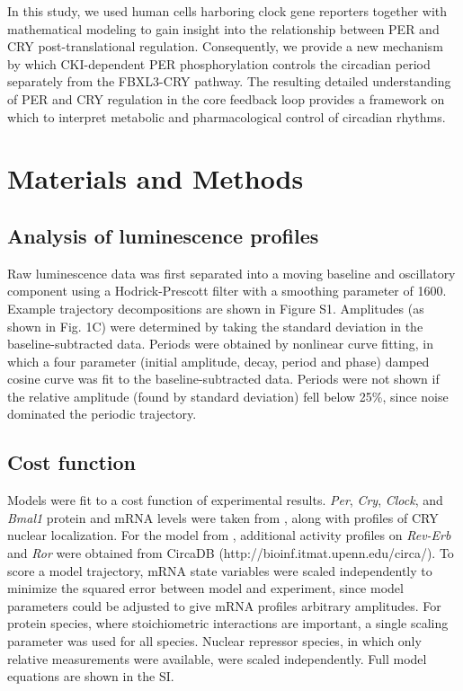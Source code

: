 In this study, we used human cells harboring clock gene reporters together with
mathematical modeling to gain insight into the relationship between PER and CRY
post-translational regulation. Consequently, we provide a new mechanism by
which CKI-dependent PER phosphorylation controls the circadian period
separately from the FBXL3-CRY pathway. The resulting detailed understanding of
PER and CRY regulation in the core feedback loop provides a framework on which
to interpret metabolic and pharmacological control of circadian rhythms.

\section{Materials and Methods}
\subsection{Analysis of luminescence profiles}
Raw luminescence data was first separated into a moving baseline and oscillatory
component using a Hodrick-Prescott filter with a smoothing parameter of 1600.
Example trajectory decompositions are shown in Figure S1. Amplitudes (as shown
in Fig. 1C) were determined by taking the standard deviation in the
baseline-subtracted data. Periods were obtained by nonlinear curve fitting, in
which a four parameter (initial amplitude, decay, period and phase) damped
cosine curve was fit to the baseline-subtracted data. Periods were not shown if
the relative amplitude (found by standard deviation) fell below 25\%, since
noise dominated the periodic trajectory. 

\subsection{Cost function}
Models were fit to a cost function of experimental results. {\it Per}, {\it
Cry}, {\it Clock}, and {\it Bmal1} protein and mRNA levels were taken from
\cite{Lee2001}, along with profiles of CRY nuclear localization. For the model
from \cite{Relogio2011}, additional activity profiles on {\it Rev-Erb} and {\it
Ror} were obtained from CircaDB (http://bioinf.itmat.upenn.edu/circa/). To score
a model trajectory, mRNA state variables were scaled independently to minimize
the squared error between model and experiment, since model parameters could be
adjusted to give mRNA profiles arbitrary amplitudes. For protein species, where
stoichiometric interactions are important, a single scaling parameter was used
for all species. Nuclear repressor species, in which only relative measurements
were available, were scaled independently. Full model equations are shown in the SI.

